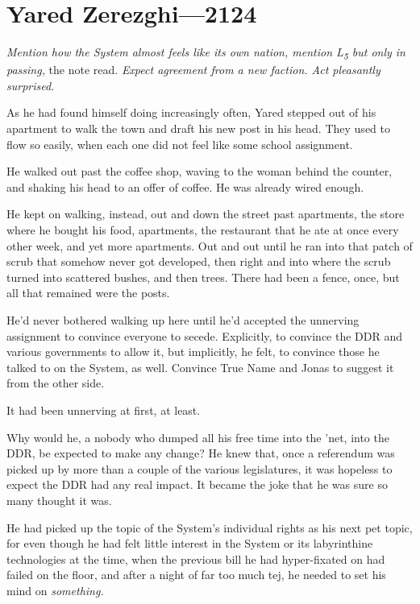 \hypertarget{yared-zerezghi-2124}{%
\chapter{Yared Zerezghi—2124}\label{yared-zerezghi-2124}}

\emph{Mention how the System almost feels like its own nation, mention L\textsubscript{5} but only in passing,} the note read. \emph{Expect agreement from a new faction. Act pleasantly surprised.}

As he had found himself doing increasingly often, Yared stepped out of his apartment to walk the town and draft his new post in his head. They used to flow so easily, when each one did not feel like some school assignment.

He walked out past the coffee shop, waving to the woman behind the counter, and shaking his head to an offer of coffee. He was already wired enough.

He kept on walking, instead, out and down the street past apartments, the store where he bought his food, apartments, the restaurant that he ate at once every other week, and yet more apartments. Out and out until he ran into that patch of scrub that somehow never got developed, then right and into where the scrub turned into scattered bushes, and then trees. There had been a fence, once, but all that remained were the posts.

He'd never bothered walking up here until he'd accepted the unnerving assignment to convince everyone to secede. Explicitly, to convince the DDR and various governments to allow it, but implicitly, he felt, to convince those he talked to on the System, as well. Convince True Name and Jonas to suggest it from the other side.

It had been unnerving at first, at least.

Why would he, a nobody who dumped all his free time into the 'net, into the DDR, be expected to make any change? He knew that, once a referendum was picked up by more than a couple of the various legislatures, it was hopeless to expect the DDR had any real impact. It became the joke that he was sure so many thought it was.

He had picked up the topic of the System's individual rights as his next pet topic, for even though he had felt little interest in the System or its labyrinthine technologies at the time, when the previous bill he had hyper-fixated on had failed on the floor, and after a night of far too much tej, he needed to set his mind on \emph{something.}

